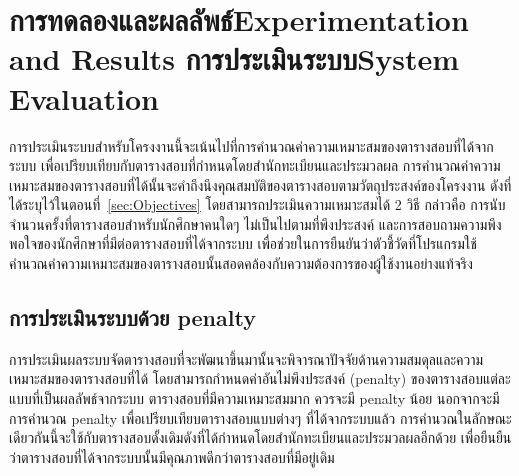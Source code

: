 \chapter{\ifproject%
\ifcpe การทดลองและผลลัพธ์\else Experimentation and Results\fi
\else%
\ifcpe การประเมินระบบ\else System Evaluation\fi
\fi}

การประเมินระบบสำหรับโครงงานนี้จะเน้นไปที่การคำนวณค่าความเหมาะสมของตารางสอบที่ได้จากระบบ เพื่อเปรียบเทียบกับตารางสอบที่กำหนดโดยสำนักทะเบียนและประมวลผล 
\enskip การคำนวณค่าความเหมาะสมของตารางสอบที่ได้นั้นจะคำถึงนึงคุณสมบัติของตารางสอบตามวัตถุประสงค์ของโครงงาน ดังที่ได้ระบุไว้ในตอนที่~\ref{sec:Objectives} 
โดยสามารถประเมินความเหมาะสมได้ 2 วิธี กล่าวคือ การนับจำนวนครั้งที่ตารางสอบสำหรับนักศึกษาคนใดๆ ไม่เป็นไปตามที่พึงประสงค์ และการสอบถามความพึงพอใจของนักศึกษาที่มีต่อตารางสอบที่ได้จากระบบ เพื่อช่วยในการยืนยันว่าตัวชี้วัดที่โปรแกรมใช้คำนวณค่าความเหมาะสมของตารางสอบนั้นสอดคล้องกับความต้องการของผู้ใช้งานอย่างแท้จริง

\section{การประเมินระบบด้วย penalty}
การประเมินผลระบบจัดตารางสอบที่จะพัฒนาขึ้นมานั้นจะพิจารณาปัจจัยด้านความสมดุลและความเหมาะสมของตารางสอบที่ได้ โดยสามารถกำหนดค่าอันไม่พึงประสงค์ (penalty) ของตารางสอบแต่ละแบบที่เป็นผลลัพธ์จากระบบ
\enskip ตารางสอบที่มีความเหมาะสมมาก ควรจะมี penalty น้อย
\enskip นอกจากจะมีการคำนวณ penalty เพื่อเปรียบเทียบตารางสอบแบบต่างๆ ที่ได้จากระบบแล้ว การคำนวณในลักษณะเดียวกันนี้จะใช้กับตารางสอบดั้งเดิมดังที่ได้กำหนดโดยสำนักทะเบียนและประมวลผลอีกด้วย เพื่อยืนยืนว่าตารางสอบที่ได้จากระบบนั้นมีคุณภาพดีกว่าตารางสอบที่มีอยู่เดิม

